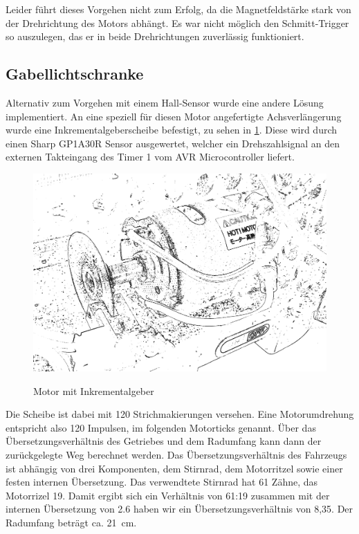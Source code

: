Leider führt dieses Vorgehen nicht zum Erfolg, da die Magnetfeldstärke stark von der Drehrichtung des Motors abhängt. Es war nicht möglich
den Schmitt-Trigger so auszulegen, das er in beide Drehrichtungen zuverlässig funktioniert.

\subsection{Gabellichtschranke}

Alternativ zum Vorgehen mit einem Hall-Sensor wurde eine andere Lösung implementiert. An eine speziell für diesen Motor angefertigte Achsverlängerung wurde eine Inkrementalgeberscheibe befestigt, zu sehen in \cref{fig:gabellichtschranke}. 
Diese wird durch einen Sharp GP1A30R Sensor ausgewertet, welcher ein Drehszahlsignal an den externen Takteingang des Timer 1 vom AVR Microcontroller liefert.
\begin{figure}[H]
\centering
\includegraphics[width=.8\textwidth]{odometrie.png}\\
\caption{Motor mit Inkrementalgeber}%
\label{fig:gabellichtschranke}
\end{figure}

Die Scheibe ist dabei mit 120 Strichmakierungen versehen. Eine Motorumdrehung entspricht also 120 Impulsen, im folgenden Motorticks genannt. Über das Übersetzungsverhältnis des Getriebes und dem Radumfang kann dann 
der zurückgelegte Weg berechnet werden. Das Übersetzungsverhältnis des Fahrzeugs ist abhängig von drei Komponenten, dem Stirnrad, dem Motorritzel sowie einer festen internen Übersetzung. Das verwendtete Stirnrad hat
61 Zähne, das Motorrizel 19. Damit ergibt sich ein Verhältnis von 61:19 zusammen mit der internen Übersetzung von 2.6  
haben wir ein Übersetzungsverhältnis von 8,35. Der Radumfang beträgt ca. \SI{21}{\cm}.

